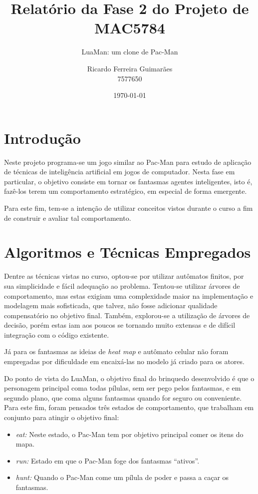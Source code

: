 \documentclass[a4paper]{scrartcl}
\title{Relatório da Fase 2 do Projeto de MAC5784}
\subtitle{LuaMan: um clone de Pac-Man}
\author{Ricardo Ferreira Guimarães \\ 7577650}
\date{\today}
\begin{document}
\maketitle

\section{Introdução}

Neste projeto programa-se um jogo similar ao Pac-Man para estudo de aplicação de
técnicas de inteligência artificial em jogos de computador. Nesta fase em particular,
o objetivo consiste em tornar os fantasmas agentes inteligentes, isto é, fazê-los terem um comportamento estratégico, em especial de forma emergente.

Para este fim, tem-se a intenção de utilizar conceitos vistos durante o curso a fim
de construir e avaliar tal comportamento.

\section{Algoritmos e Técnicas Empregados}

Dentre as técnicas vistas no curso, optou-se por utilizar autômatos finitos,
por sua simplicidade e fácil adequação ao problema. Tentou-se utilizar árvores de
comportamento, mas estas exigiam uma complexidade maior na implementação e modelagem mais
sofisticada, que talvez, não fosse adicionar qualidade compensatório no objetivo final.
Também, explorou-se a utilização de árvores de decisão, porém estas iam aos poucos se tornando
muito extensas e de difícil integração com o código existente.

Já para os fantasmas as ideias de \textit{heat map} e autômato celular não foram empregadas
por dificuldade em encaixá-las no modelo já criado para os atores.

Do ponto de vista do LuaMan, o objetivo final do brinquedo desenvolvido é que o
personagem principal coma todas pílulas, sem ser pego pelos fantasmas, e em segundo plano, que coma alguns fantasmas quando for seguro ou conveniente. 
Para este fim, foram pensados três estados de comportamento, que trabalham em conjunto para atingir o objetivo final:

\begin{itemize}
	\item \textit{eat:} Neste estado, o Pac-Man tem por objetivo principal comer os itens do mapa.
	\item \textit{run:} Estado em que o Pac-Man foge dos fantasmas ``ativos''.
	\item \textit{hunt:} Quando o Pac-Man come um pílula de poder e passa a caçar os fantasmas.
\end{itemize}
\end{document}
